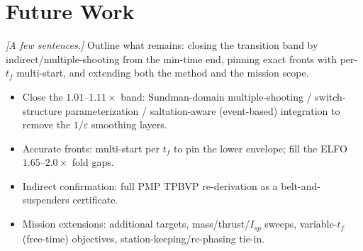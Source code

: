 \documentclass[11pt]{article}
\begin{document}
\section{Future Work}
\emph{[A few sentences.]} Outline what remains: closing the transition band by
indirect/multiple-shooting from the min-time end, pinning exact fronts with
per-$t_f$ multi-start, and extending both the method and the mission scope.

\begin{itemize}
  \item Close the $1.01$--$1.11\times$ band: Sundman-domain multiple-shooting /
        switch-structure parameterization / saltation-aware (event-based)
        integration to remove the $1/\varepsilon$ smoothing layers.
  \item Accurate fronts: multi-start per $t_f$ to pin the lower envelope; fill
        the ELFO $1.65$--$2.0\times$ fold gaps.
  \item Indirect confirmation: full PMP TPBVP re-derivation as a
        belt-and-suspenders certificate.
  \item Mission extensions: additional targets, mass/thrust/$I_{sp}$ sweeps,
        variable-$t_f$ (free-time) objectives, station-keeping/re-phasing tie-in.
\end{itemize}
\end{document}
